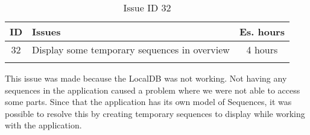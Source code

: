 \begin{longtable} { | c | p{12cm} | c | } 
\hline
	ID 	&	Issues	&		 Es. hours \\\hline
	32 	&	Display some temporary sequences in overview	&	4 hours \\\hline
\caption{Issue ID 32}
\label{tab:spr2_fakesequences}
\end{longtable}

This issue was made because the LocalDB was not working. Not having any sequences in the application caused a problem where we were not able to access some parts. Since that the application has its own model of Sequences, it was possible to resolve this by creating temporary sequences to display while working with the application. 